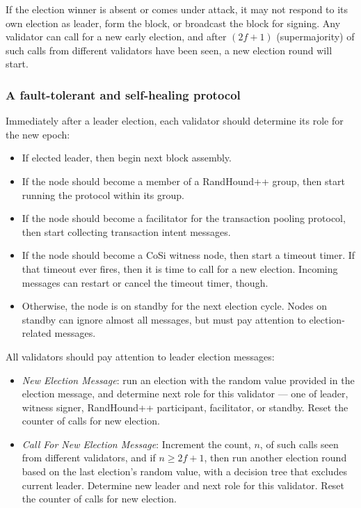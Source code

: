 \documentclass[a4paper, 10pt, conference]{ieeeconf}
\begin{document}
If the election winner is absent or comes under attack, it may not respond to its own election as leader, form the block, or broadcast the block for signing. Any validator can call for a new early election, and after $(2 f+1)$ (supermajority) of such calls from different validators have been seen, a new election round will start.

\subsubsection{A fault-tolerant and self-healing protocol} 
Immediately after a leader election, each validator should determine its role for the new epoch:

\begin{itemize}
	\item If elected leader, then begin next block assembly. 
	\item If the node should become a member of a RandHound++ group, then start running the protocol within its group.
	\item If the node should become a facilitator for the transaction pooling protocol, then start collecting transaction intent messages.
	\item If the node should become a CoSi witness node, then start a timeout timer. If that timeout ever fires, then it is time to call for a new election. Incoming messages can restart or cancel the timeout timer, though.
	\item Otherwise, the node is on standby for the next election cycle. Nodes on standby can ignore almost all messages, but must pay attention to election-related messages.
\end{itemize}  

All validators should pay attention to leader election messages:

\begin{itemize}
	\item{\textit{New Election Message}: run an election with the random value provided in the election message, and determine next role for this validator --- one of leader, witness signer, RandHound++ participant, facilitator, or standby. Reset the counter of calls for new election.}
	\item{\textit{Call For New Election Message}: Increment the count, $n$, of such calls seen from different validators, and if $n \ge 2 f +1$, then run another election round based on the last election's random value, with a decision tree that excludes current leader. Determine new leader and next role for this validator. Reset the counter of calls for new election.}
\end{itemize}
\end{document}
